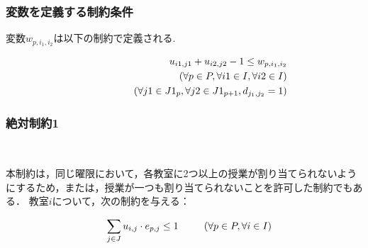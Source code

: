 \documentclass[dvipdfmx,12pt]{beamer}
\begin{document}
\begin{frame}

  \frametitle{\LARGE 変数を定義する制約条件}



\vspace{5.0mm}


変数$w_{p,i_1,i_2}$は以下の制約で定義される.

{\Large
\begin{eqnarray}
\label{eqneqn:seiyaku_first} 
&& u_{i1,j1} + u_{i2,j2} - 1  \leq w_{p,i_1,i_2}\\
&&\hspace{15.0mm} \left(\forall p \in P,\forall i1 \in I,\forall i2 \in I\right)\nonumber\\
&&\hspace{15.0mm} \left(\forall j1 \in J1_{p},\forall j2 \in J1_{p+1},d_{j_1,j_2}=1\right)\nonumber 
\end{eqnarray}
}


\end{frame}


\begin{frame}

  \frametitle{\LARGE 絶対制約1}



\\
\vspace{5.0mm}

本制約は，同じ曜限において，各教室に2つ以上の授業が割り当てられないようにするため，または，授業が一つも割り当てられないことを許可した制約でもある．
教室$i$について，次の制約を与える：

{\Large
\begin{eqnarray}
&&\sum_{j \in J} u_{i,j} \cdot e_{p,j} \leq 1 \hspace{5.0mm}
\quad \left (\forall p \in P, \forall i \in I \right)
\end{eqnarray} 
}
\end{frame}
\end{document}
